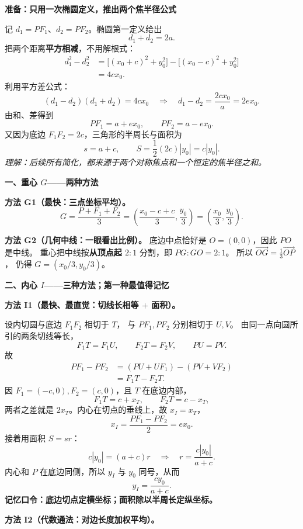 \begin{proofbox}
\textbf{准备：只用一次椭圆定义，推出两个焦半径公式}

记 $d_1=PF_1$、$d_2=PF_2$。椭圆第一定义给出
\[
 d_1+d_2=2a.
\]
把两个距离\textbf{平方相减}，不用解根式：
\begin{align*}
 d_1^2-d_2^2
 &=\bigl[(x_0+c)^2+y_0^2\bigr]
   -\bigl[(x_0-c)^2+y_0^2\bigr]\\
 &=4cx_0.
\end{align*}
利用平方差公式：
\[
 (d_1-d_2)(d_1+d_2)=4cx_0
 \quad\Longrightarrow\quad
 d_1-d_2=\frac{2cx_0}{a}=2ex_0.
\]
由和、差得到
\[
 \boxed{PF_1=a+ex_0},\qquad
 \boxed{PF_2=a-ex_0}.
\]
又因为底边 $F_1F_2=2c$，三角形的半周长与面积为
\[
 \boxed{s=a+c},\qquad
 \boxed{S=\frac12(2c)|y_0|=c|y_0|}.
\]
\textit{理解：后续所有简化，都来源于两个对称焦点和一个恒定的焦半径之和。}

\tcbline
\textbf{一、重心 $G$——两种方法}

\textbf{方法 G1（最快：三点坐标平均）。}
\[
 G=\frac{P+F_1+F_2}{3}
 =\left(\frac{x_0-c+c}{3},\frac{y_0}{3}\right)
 =\boxed{\left(\frac{x_0}{3},\frac{y_0}{3}\right)}.
\]

\textbf{方法 G2（几何中线：一眼看出比例）。}
底边中点恰好是 $O=(0,0)$，因此 $PO$ 是中线。
重心把中线按\textbf{从顶点起 $2:1$} 分割，即 $PG:GO=2:1$。
所以 $\overrightarrow{OG}=\tfrac13\overrightarrow{OP}$，
仍得 $G=(x_0/3,y_0/3)$。

\tcbline
\textbf{二、内心 $I$——三种方法；第一种最值得记忆}

\textbf{方法 I1（最快、最直觉：切线长相等 $+$ 面积）。}

设内切圆与底边 $F_1F_2$ 相切于 $T$，
与 $PF_1,PF_2$ 分别相切于 $U,V$。
由同一点向圆所引的两条切线等长，
\[
 F_1T=F_1U,\qquad F_2T=F_2V,\qquad PU=PV.
\]
故
\begin{align*}
 PF_1-PF_2
 &=(PU+UF_1)-(PV+VF_2)\\
 &=F_1T-F_2T.
\end{align*}
因 $F_1=(-c,0),F_2=(c,0)$，且 $T$ 在底边内部，
\[
 F_1T=c+x_T,\qquad F_2T=c-x_T,
\]
两者之差就是 $2x_T$。内心在切点的垂线上，故 $x_I=x_T$，
\[
 \boxed{x_I=\frac{PF_1-PF_2}{2}=ex_0}.
\]
接着用面积 $S=sr$：
\[
 c|y_0|=(a+c)r
 \quad\Longrightarrow\quad
 r=\frac{c|y_0|}{a+c}.
\]
内心和 $P$ 在底边同侧，所以 $y_I$ 与 $y_0$ 同号，从而
\[
 \boxed{y_I=\frac{cy_0}{a+c}}.
\]
\textbf{记忆口令：底边切点定横坐标；面积除以半周长定纵坐标。}

\medskip
\textbf{方法 I2（代数通法：对边长度加权平均）。}


\end{proofbox}
